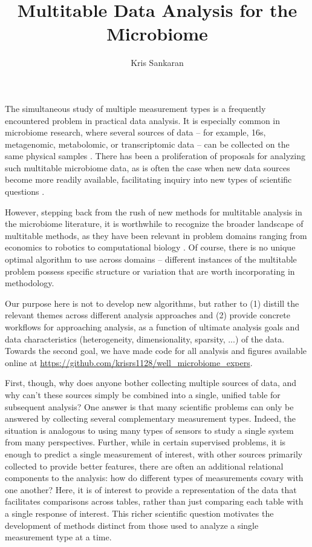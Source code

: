 \documentclass[14pt]{extarticle}
\title{Multitable Data Analysis for the Microbiome}
\author{Kris Sankaran}
\begin{document}
\maketitle

\tableofcontents

The simultaneous study of multiple measurement types is a frequently encountered
problem in practical data analysis. It is especially common in microbiome
research, where several sources of data -- for example, 16s, metagenomic,
metabolomic, or transcriptomic data -- can be collected on the same physical
samples \citep{Franzosa2015, McHardy2013}. There has been a proliferation of
proposals for analyzing such multitable microbiome data, as is often the case
when new data sources become more readily available, facilitating inquiry into
new types of scientific questions \citep{Fukuyama2017, Rahnavard2017,
  Chaudhary2017, Chalise2017}.

However, stepping back from the rush of new methods for multitable analysis in
the microbiome literature, it is worthwhile to recognize the broader landscape
of multitable methods, as they have been relevant in problem domains ranging
from economics \citep{hannan1967canonical} to robotics
\citep{vlassis2000supervised} to computational biology \citep{gomez2014data}. Of
course, there is no unique optimal algorithm to use across domains -- different
instances of the multitable problem possess specific structure or variation
that are worth incorporating in methodology.

Our purpose here is not to develop new algorithms, but rather to (1) distill the
relevant themes across different analysis approaches and (2) provide concrete
workflows for approaching analysis, as a function of ultimate analysis goals and
data characteristics (heterogeneity, dimensionality, sparsity, ...) of the data.
Towards the second goal, we have made code for all analysis and figures
available online at
\url{https://github.com/krisrs1128/well\_microbiome\_expers}.

First, though, why does anyone bother collecting multiple sources of data, and
why can't these sources simply be combined into a single, unified table for
subsequent analysis? One answer is that many scientific problems can only be
answered by collecting several complementary measurement types. Indeed, the
situation is analogous to using many types of sensors to study a single system
from many perspectives. Further, while in certain supervised problems, it is
enough to predict a single measurement of interest, with other sources primarily
collected to provide better features, there are often an additional relational
components to the analysis: how do different types of measurements covary with
one another? Here, it is of interest to provide a representation of
the data that facilitates comparisons across tables, rather than just comparing
each table with a single response of interest. This richer scientific question
motivates the development of methods distinct from those used to analyze a
single measurement type at a time.
\end{document}
